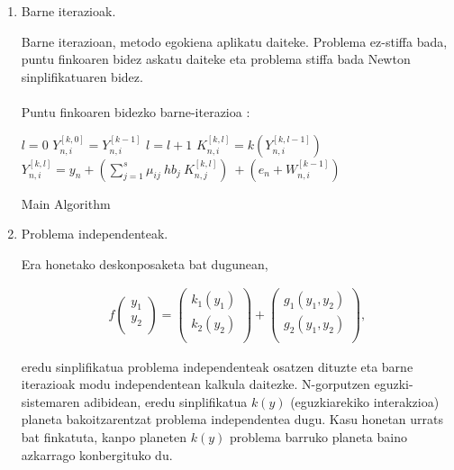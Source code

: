 \begin{enumerate}
\item Barne iterazioak.

Barne iterazioan, metodo egokiena aplikatu daiteke. Problema ez-stiffa bada, puntu finkoaren bidez askatu daiteke eta problema stiffa bada Newton sinplifikatuaren bidez. 

\paragraph*{} Puntu finkoaren bidezko barne-iterazioa :

\begin{algorithm}[H]
 \BlankLine
  $l=0$\;
  $Y_{n,i}^{[k,0]}=Y_{n,i}^{[k-1]}$\;
  {
   \BlankLine
   $l=l+1$\;  
   \BlankLine
   $K_{n,i}^{[k,l]}=k(Y_{n,i}^{[k,l-1]})$\;
   $Y_{n,i}^{[k,l]}=y_{n} + \left(\sum\limits_{j=1}^{s} \mu_{ij} \ hb_j \ K_{n,j}^{[k,l]} \right) \ + (e_{n} + W_{n,i}^{[k-1]}) $\;
  }
 \caption{Main Algorithm}
\end{algorithm}


\item Problema independenteak.

Era honetako deskonposaketa bat dugunean,

\begin{align*}
f\left ( \begin{array}{c}
   y_1 \\
   y_2 \\
\end{array} \right)=
\left ( \begin{array}{c}
   k_1(y_1) \\
   k_2(y_2) \\
\end{array} \right)+
\left ( \begin{array}{c}
   g_1(y_1,y_2) \\
   g_2(y_1,y_2) \\
\end{array} \right),
\end{align*}

eredu sinplifikatua problema independenteak osatzen dituzte eta barne iterazioak modu independentean kalkula daitezke. N-gorputzen eguzki-sistemaren adibidean, eredu sinplifikatua $k(y)$ (eguzkiarekiko interakzioa) planeta bakoitzarentzat problema independentea dugu. Kasu honetan urrats bat finkatuta, kanpo planeten $k(y)$ problema barruko planeta baino azkarrago konbergituko du. 

\end{enumerate}


